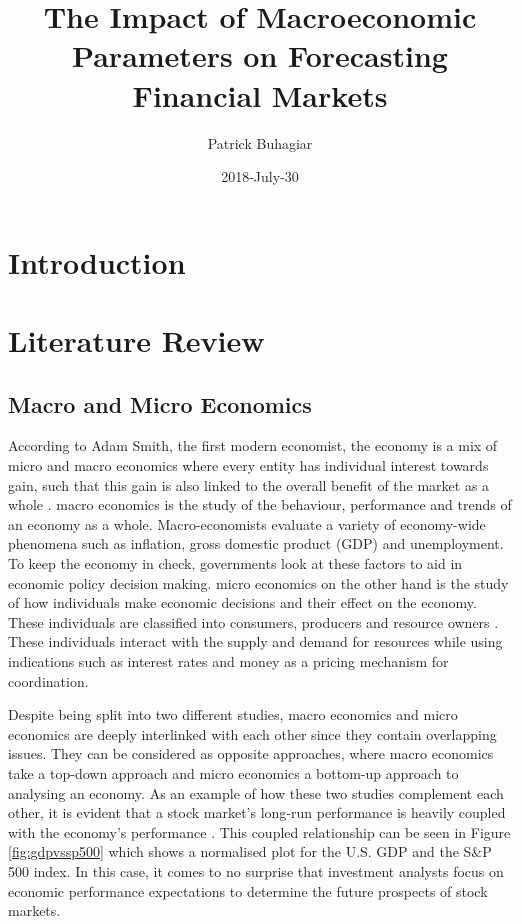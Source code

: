 \documentclass{UoYCSproject}
\author{Patrick Buhagiar}
\title{The Impact of Macroeconomic Parameters on Forecasting Financial Markets}
\date{2018-July-30}
\begin{document}
\maketitle

\listoffigures
\listoftables

\label{sec:start}
\thispagestyle{empty}\cleardoublepage

\chapter{Introduction}
\label{cha:literaturereview}

\chapter{Literature Review}
\label{cha:background}

\section{Macro and Micro Economics}
According to Adam Smith, the first modern economist, the economy is a mix of micro and macro economics where every entity has individual interest towards gain, such that this gain is also linked to the overall benefit of the market as a whole \cite{smith1950inquiry}. macro economics is the study of the behaviour, performance and trends of an economy as a whole. Macro-economists evaluate a variety of economy-wide phenomena such as inflation, gross domestic product (GDP) and unemployment. To keep the economy in check, governments look at these factors to aid in economic policy decision making. micro economics on the other hand is the study of how individuals make economic decisions and their effect on the economy. These individuals are classified into consumers, producers and resource owners \cite{dwivedi2002microeconomics}. These individuals interact with the supply and demand for resources while using indications such as interest rates and money as a pricing mechanism for coordination. 

Despite being split into two different studies, macro economics and micro economics are deeply interlinked with each other since they contain overlapping issues. They can be considered as opposite approaches, where macro economics take a top-down approach and micro economics a bottom-up approach to analysing an economy. As an example of how these two studies complement each other, it is evident that a stock market's long-run performance is heavily coupled with the economy's performance \cite{davis2008macroeconomic}. This coupled relationship can be seen in Figure \ref{fig:gdpvssp500} which shows a normalised plot for the U.S. GDP and the S\&P 500 index. In this case, it comes to no surprise that investment analysts focus on economic performance expectations to determine the future prospects of stock markets.
\end{document}
